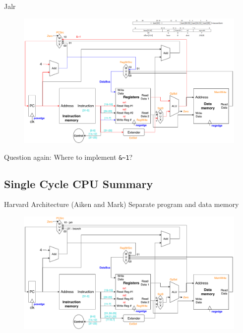 \documentclass[UTF8]{ctexbeamer}
\newcommand{\fontsm}{\fontsize{8}{9.2}\selectfont}
\begin{document}
\begin{frame}[fragile]{Jalr}
\fontsm{\verb'x[rd]=pc+4; pc=(x[rs1]+sext(offset))&~1;' 偏移量同样是2的倍数，地址非4的倍数抛异常}
\begin{figure}
\centering
\includegraphics[width=0.8\linewidth]{fig/Lecture2/Datapath-jalr.pdf}
\end{figure}
Question again: Where to implement \verb'&~1'?
\end{frame}

\subsection{Single Cycle CPU Summary}
\begin{frame}
\subsectionpage
\end{frame}

\begin{frame}{Harvard Architecture (Aiken and Mark)}
Separate program and data memory
\begin{figure}
\centering
\includegraphics[width=\linewidth]{fig/Lecture2/Datapath-All.pdf}
\end{figure}
\end{frame}
\end{document}
